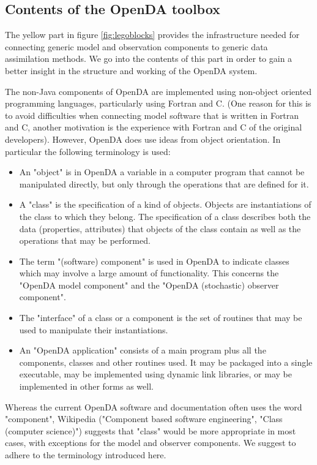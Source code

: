 \subsection{Contents of the OpenDA toolbox}

The yellow part in figure \ref{fig:legoblocks} provides the infrastructure needed for connecting generic model and observation components to generic data assimilation methods. We go into the contents of this part in order to gain a better insight in the structure and working of the OpenDA system.

The non-Java components of OpenDA are implemented using non-object oriented programming languages, particularly using Fortran and C. (One reason for this is to avoid difficulties when connecting model software that is written in Fortran and C, another motivation is the experience with Fortran and C of the original developers). However, OpenDA does use ideas from object orientation. In particular the following terminology is used:

\begin{itemize}
	\item An "object" is in OpenDA a variable in a computer program that cannot be manipulated directly, but only through the operations that are defined for it. 
	\item A "class" is the specification of a kind of objects. Objects are instantiations of the class to which they belong. The specification of a class describes both the data (properties, attributes) that objects of the class contain as well as the operations that may be performed. 
	\item The term "(software) component" is used in OpenDA to indicate classes which may involve a large amount of functionality. This concerns the "OpenDA model component" and the "OpenDA (stochastic) observer component". 
	\item The "interface" of a class or a component is the set of routines that may be used to manipulate their instantiations. 
	\item An "OpenDA application" consists of a main program plus all the components, classes and other routines used. It may be packaged into a single executable, may be implemented using dynamic link libraries, or may be implemented in other forms as well. 
\end{itemize}

Whereas the current OpenDA software and documentation often uses the word "component", Wikipedia ("Component based software engineering", "Class (computer science)") suggests that "class" would be more appropriate in most cases, with exceptions for the model and observer components. We suggest to adhere to the terminology introduced here.

